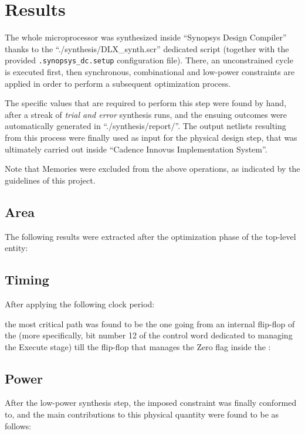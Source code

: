 \chapter{Results}
\label{res}
The whole microprocessor was synthesized inside ``Synopsys Design Compiler'' thanks to the ``./synthesis/DLX\_synth.scr'' dedicated script (together with the provided \texttt{.synopsys\_dc.setup} configuration file). There, an unconstrained cycle is executed first, then synchronous, combinational and low-power constraints are applied in order to perform a subsequent optimization process.

The specific values that are required to perform this step were found by hand, after a streak of \emph{trial and error} synthesis runs, and the ensuing outcomes were automatically generated in ``./synthesis/report/''. The output netlists resulting from this process were finally used as input for the physical design step, that was ultimately carried out inside ``Cadence Innovus Implementation System''.

Note that Memories were excluded from the above operations, as indicated by the guidelines of this project.

\section{Area}
The following results were extracted after the optimization phase of the top-level entity:


\section{Timing}
After applying the following clock period:

the most critical path was found to be the one going from an internal flip-flop of the  (more specifically, bit number 12 of the control word dedicated to managing the Execute stage) till the flip-flop that manages the Zero flag inside the :


\section{Power}
After the low-power synthesis step, the imposed constraint was finally conformed to, and the main contributions to this physical quantity were found to be as follows:


